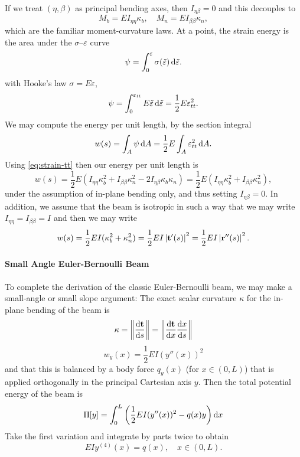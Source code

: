 If we treat \((\eta,\beta)\) as principal bending axes, then \(I_{\eta\beta} = 0\) and this decouples to
\begin{equation*}
	M_b = E I_{\eta\eta} \kappa_b, \quad M_n = E I_{\beta\beta} \kappa_n,
\end{equation*}
which are the familiar moment-curvature laws. At a point, the strain energy is the area under the \(\sigma\)--\(\varepsilon\) curve
\begin{equation*}
	\psi = \int_0^{\varepsilon} \sigma(\tilde \varepsilon) \odif{\tilde \varepsilon}.
\end{equation*}
with Hooke's law \(\sigma = E \varepsilon\),
\begin{equation*}
	\psi = \int_0^{\varepsilon_{tt}} E \tilde \varepsilon \odif{\tilde \varepsilon} = \frac12 E \varepsilon_{tt}^2.
\end{equation*}
We may compute the energy per unit length, by the section integral
\begin{equation*}
	w(s) = \int_A \psi \odif{A} = \frac{1}{2} E \int_A \varepsilon_{tt}^2 \odif{A}.
\end{equation*}
Using \eqref{eq:strain-tt} then our energy per unit length is
\begin{equation*}
	w(s) = \frac12 E (I_{\eta\eta} \kappa_b^2 + I_{\beta\beta} \kappa_n^2 - 2I_{\eta\beta}\kappa_b \kappa_n) = \frac12 E (I_{\eta\eta}\kappa_b^2 + I_{\beta\beta}\kappa_n^2),
\end{equation*}
under the assumption of in-plane bending only, and thus setting \(I_{\eta\beta} = 0\). In addition, we assume that the beam is isotropic in such a way that we may write \(I_{\eta\eta} = I_{\beta\beta} = I\) and then we may write
\begin{equation}
	w(s) = \frac12 EI (\kappa_b^2 + \kappa_n^2) = \frac12 EI \left| \mathbf{t}'(s) \right|^2  = \frac12 EI \left| \mathbf{r}''(s) \right|^2.
\end{equation}

\paragraph {Small Angle Euler-Bernoulli Beam}
To complete the derivation of the classic Euler-Bernoulli beam, we may make a
small-angle or small slope argument: The exact scalar curvature \(\kappa\) for
the in-plane bending of the beam is
\begin{equation*}
	\kappa = \norm{\odv{\vec t}{s}} = \norm{ \odv{\vec t}{x} \odv{x}{s}}
\end{equation*}
\begin{equation*}
	w_y(x) = \frac{1}{2} EI (y''(x))^2
\end{equation*}
and that this is balanced by a body force \(q_y(x)\) (for \(x\in(0,L)\)) that is applied orthogonally in the principal Cartesian axis \(y\). Then the total potential energy of the beam is
\begin{equation*}
	\Pi[y] = \int_0^L \left(\frac12 EI (y''(x))^2 - q(x)y\right) \odif{x}
\end{equation*}
Take the first variation and integrate by parts twice to obtain
\begin{equation*}
	EI y^{(4)}(x) = q(x), \quad x \in (0,L).
\end{equation*}

